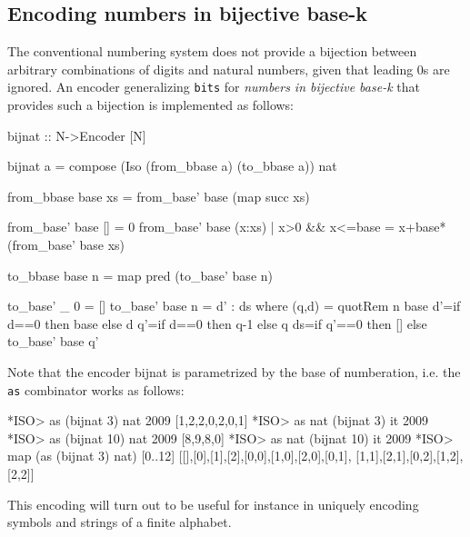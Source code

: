 \documentclass[]{INCLUDES/llncs}
\begin{document}
\subsection{Encoding numbers in bijective base-k} \label{bijnat}

The conventional numbering system does not provide a bijection between
arbitrary combinations of digits and natural numbers, given that leading 0s are
ignored. An encoder generalizing {\tt bits} for {\em numbers in bijective
base-k} that provides such a bijection is implemented as follows:
\begin{code}
bijnat :: N->Encoder [N]

bijnat a = compose (Iso (from_bbase a) (to_bbase a)) nat

from_bbase base xs = from_base' base (map succ xs)

from_base' base [] = 0
from_base' base (x:xs) | x>0 && x<=base = 
   x+base*(from_base' base xs)
   
to_bbase base n = map pred (to_base' base n)

to_base' _ 0 = []
to_base' base n = d' : ds where
   (q,d) = quotRem n base
   d'=if d==0 then base else d
   q'=if d==0 then q-1 else q
   ds=if q'==0 then [] else to_base' base q'
\end{code}
Note that the encoder bijnat is parametrized by the base of numberation, i.e.
the {\tt as} combinator works as follows:
\begin{codex}
*ISO> as (bijnat 3) nat 2009
[1,2,2,0,2,0,1]
*ISO> as nat (bijnat 3) it
2009
*ISO> as (bijnat 10) nat 2009
[8,9,8,0]
*ISO> as nat (bijnat 10) it
2009
*ISO> map (as (bijnat 3) nat) [0..12]
[[],[0],[1],[2],[0,0],[1,0],[2,0],[0,1],
    [1,1],[2,1],[0,2],[1,2],[2,2]]
\end{codex}
This encoding will turn out to be useful for instance in uniquely encoding
symbols and strings of a finite alphabet.
\end{document}
